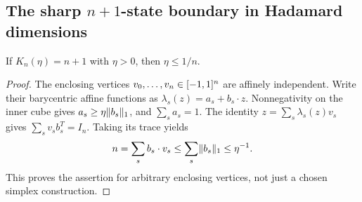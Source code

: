 \subsection{The sharp \texorpdfstring{$n+1$}{n+1}-state boundary in Hadamard dimensions}
\begin{lemma}\label{lem:trace}
If $K_n(\eta)=n+1$ with $\eta>0$, then $\eta\le1/n$.
\end{lemma}
\begin{proof}
The enclosing vertices $v_0,\ldots,v_n\in[-1,1]^n$ are affinely
independent. Write their barycentric affine functions as
$\lambda_s(z)=a_s+b_s\cdot z$. Nonnegativity on the inner cube gives
$a_s\ge\eta\lVert b_s\rVert_1$, and $\sum_sa_s=1$. The identity
$z=\sum_s\lambda_s(z)v_s$ gives
$\sum_s v_sb_s^T=I_n$. Taking its trace yields
\[
 n=\sum_s b_s\cdot v_s\le\sum_s\lVert b_s\rVert_1\le\eta^{-1}.
\]
This proves the assertion for arbitrary enclosing vertices, not just
a chosen simplex construction.
\end{proof}

